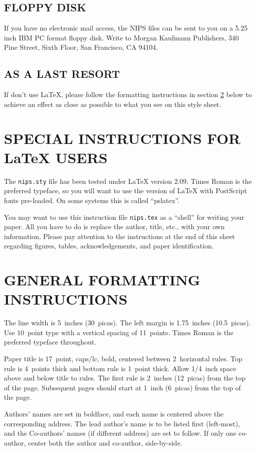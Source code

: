 \documentclass{article} %
\begin{document}
\subsection{FLOPPY DISK}
If you have no electronic mail access, the NIPS files can be sent
to you on a 5.25 inch IBM PC format floppy disk.  Write to Morgan
Kaufmann Publishers, 340 Pine Street, Sixth Floor, San Francisco, CA
94104.

\subsection{AS A LAST RESORT}
If don't use \LaTeX{}, please follow the formatting instructions in
section \ref{sec-format} below to achieve an effect as close as
possible to what you see on this style sheet.

\section{SPECIAL INSTRUCTIONS FOR \LaTeX{} USERS}
The \verb+nips.sty+ file has been tested under \LaTeX{} version 2.09. 
Times Roman is the preferred typeface, so you will want to use the
version of \LaTeX{} with PostScript fonts pre-loaded.  On some systems
this is called ``pslatex''.

You may want to use this instruction file \verb+nips.tex+ as a
``shell'' for writing your paper.  All you have to do is replace
the author, title, etc., with your own information.  Please pay
attention to the instructions at the end of this sheet regarding
figures, tables, acknowledgements, and paper identification.

\section{GENERAL FORMATTING INSTRUCTIONS}
\label{sec-format}

The line width is 5~inches (30~picas). The left margin is
1.75~inches (10.5~picas). Use 10~point type with a vertical spacing
of 11~points. Times Roman is the preferred typeface throughout.

Paper title is 17~point, caps/lc, bold, centered between
2~horizontal rules.  Top rule is 4~points thick and bottom rule is
1~point thick. Allow 1/4~inch space above and below title to rules.
The first rule is 2~inches (12~picas) from the top of the page.
Subsequent pages should start at 1~inch (6~picas) from the top of
the page. 

Authors' names are set in boldface, and each name is centered above
the corresponding address.   The lead author's name
is to be listed first (left-most), and the Co-authors' names (if
different address) are set to follow.  If only one co-author,
center both the author and co-author, side-by-side.
\end{document}
